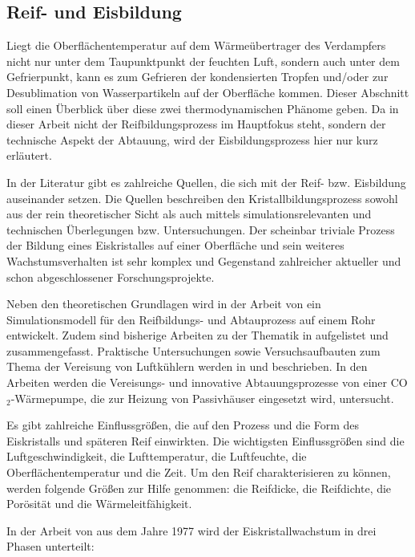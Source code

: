 
\subsection{Reif- und Eisbildung}
\label{subsec:Reifbildung}

Liegt die Oberflächentemperatur auf dem Wärmeübertrager des Verdampfers nicht nur unter dem Taupunktpunkt der feuchten Luft, sondern auch unter dem Gefrierpunkt, kann es zum Gefrieren der kondensierten Tropfen und/oder zur Desublimation von Wasserpartikeln auf der Oberfläche kommen. Dieser Abschnitt soll einen Überblick über diese zwei thermodynamischen Phänome geben. Da in dieser Arbeit nicht der Reifbildungsprozess im Hauptfokus steht, sondern  der technische Aspekt der Abtauung, wird der Eisbildungsprozess hier nur kurz erläutert.

In der Literatur gibt es zahlreiche Quellen, die sich mit der Reif- bzw. Eisbildung auseinander setzen. Die Quellen beschreiben den Kristallbildungsprozess sowohl aus der rein theoretischer Sicht als auch mittels simulationsrelevanten und technischen Überlegungen bzw. Untersuchungen. Der scheinbar triviale Prozess der Bildung eines Eiskristalles auf einer Oberfläche und sein weiteres Wachstumsverhalten ist sehr komplex und Gegenstand zahlreicher aktueller und schon abgeschlossener Forschungsprojekte.

Neben den theoretischen Grundlagen wird in der Arbeit von \textsc{\citeauthor{Schydlo2010}} ein Simulationsmodell für den Reifbildungs- und Abtauprozess auf einem Rohr entwickelt. Zudem sind bisherige Arbeiten zu der Thematik in \citep{Schydlo2010} aufgelistet und zusammengefasst. 
Praktische Untersuchungen sowie Versuchsaufbauten zum Thema der Vereisung von Luftkühlern werden in \textsc{\citeauthor{Sahinagic2004}} und \textsc{\citeauthor{Kosowski2009}} beschrieben. In den Arbeiten werden die Vereisungs- und innovative Abtauungsprozesse von einer CO$_2$-Wärmepumpe, die zur Heizung von Passivhäuser eingesetzt wird, untersucht.   



Es gibt zahlreiche Einflussgrößen, die auf den Prozess und die Form des Eiskristalls und späteren Reif einwirkten. 
  Die wichtigsten Einflussgrößen sind die Luftgeschwindigkeit, die Lufttemperatur, die Luftfeuchte, die Oberflächentemperatur und die Zeit. Um den Reif charakterisieren zu können, werden folgende Größen zur Hilfe genommen: die Reifdicke, die Reifdichte, die Porösität und die Wärmeleitfähigkeit. 

In der Arbeit von \textsc{\citeauthor{Hayashi1977}} aus dem Jahre 1977 wird der Eiskristallwachstum in drei Phasen unterteilt:

